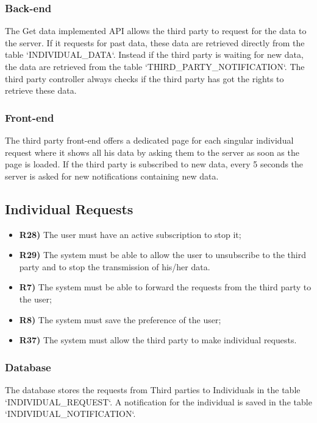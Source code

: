 \subsubsection*{Back-end}
The Get data implemented API allows the third party to request for the data to the server. If it requests for past data, these data are retrieved directly from the table `INDIVIDUAL\_DATA`. Instead if the third party is waiting for new data, the data are retrieved from the table `THIRD\_PARTY\_NOTIFICATION`. The third party controller always checks if the third party has got the rights to retrieve these data.

\subsubsection*{Front-end}
The third party front-end offers a dedicated page for each singular individual request where it shows all his data by asking them to the server as soon as the page is loaded. If the third party is subscribed to new data, every 5 seconds the server is asked for new notifications containing new data.

\subsection{Individual Requests}
\begin{itemize}	
	\item {\color{Green}\textbf{R28)}} The user must have an active subscription to stop it;
	\item {\color{Green}\textbf{R29)}} The system must be able to allow the user to unsubscribe to the third party and to stop the transmission of his/her data.
	\item {\color{Green}\textbf{R7)}} The system must be able to forward the requests from the third party to the user;
	\item {\color{Green}\textbf{R8)}} The system must save the preference of the user;
	\item {\color{Green}\textbf{R37)}} The system must allow the third party to make individual requests.\\
\end{itemize}

\subsubsection*{Database}
The database stores the requests from Third parties to Individuals in the table `INDIVIDUAL\_REQUEST`. A notification for the individual is saved in the table `INDIVIDUAL\_NOTIFICATION`.

